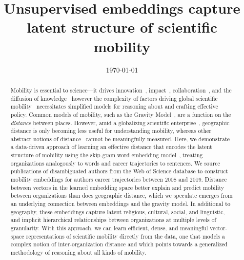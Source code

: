 \documentclass[12pt]{article} %
\begin{document}

\title{Unsupervised embeddings capture latent structure of scientific mobility} %
\date{\today}
\maketitle %

%
%

\begin{abstract}

Mobility is essential to science---it drives innovation~\autocite{braunerhjelm2020labor, kaiser2018innovation, armano2017innovation}, impact~\autocite{sugimoto2017mostimpact, petersen2018multiscale, jonkers2013return, franzoni2014advantage}, collaboration~\autocite{rodrigues2016mobility}, and the diffusion of knowledge~\autocite{braunerhjelm2020labor, azoulay2011diffusion, morgan2018prestige} however the complexity of factors driving global scientific mobility~\autocite{robinson2019mobility, vannoorden2012mobility, deville2014career, ackers2008mobility, scott2015dynamics} necessitates simplified models for reasoning about and crafting effective policy. 
Common models of mobility, such as the Gravity Model~\autocite{curiel2018citygravity, lewer2008immigrationgravity, jung2008highwaygravity, hong2016busgravity, truscott2012epidemicgravity, xia2005measlesgravity, simini2012universal}, are a function on the \textit{distance} between places.
However, amid a globalizing scientific enterprise~\autocite{czaika2018globalisation}, geographic distance is only becoming less useful for understanding mobility, whereas other abstract notions of distance~\autocite{boschma2005proximity} cannot be meaningfully measured.
Here, we demonstrate a data-driven approach of learning an effective distance that encodes the latent structure of mobility using the skip-gram word embedding model~\autocite{mikolov2013word2vec}, treating organizations analogously to words and career trajectories to sentences.
We source publications of disambiguated authors from the Web of Science database to construct mobility embeddings for authors career trajectories between 2008 and 2019. 
Distance between vectors in the learned embedding space better explain and predict mobility between organizations than does geographic distance, which we speculate emerges from an underlying connection between embeddings and the gravity model.
In additional to geography, these embeddings capture latent religious, cultural, social, and linguistic, and implicit hierarchical relationships between organizations at multiple levels of granularity.
With this approach, we can learn efficient, dense, and meaningful vector-space representations of scientific mobility directly from the data, one that models a complex notion of inter-organization distance and which points towards a generalized methodology of reasoning about all kinds of mobility. 

\end{abstract}
\end{document}
